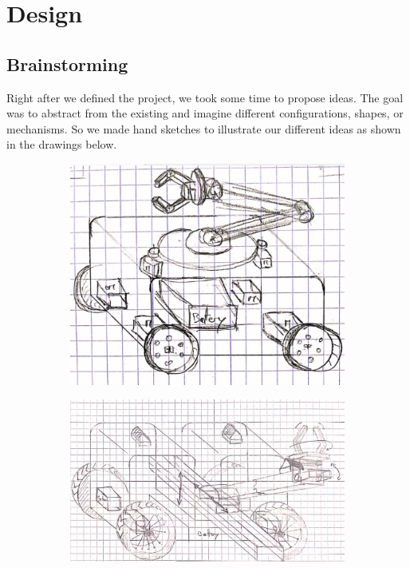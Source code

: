 \section{Design}\insertloftspace
\setcounter{figure}{0}\setcounter{table}{0}
\label{Des}
\subsection{Brainstorming}
\label{BraSto}
Right after we defined the project, we took some time to propose ideas. The goal was to abstract from the existing and imagine different configurations, shapes, or mechanisms. So we made hand sketches to illustrate our different ideas as shown in the drawings below. 
\begin{figure}[H]
    \begin{subfigure}{.5\linewidth}
        \centering
        \includegraphics[scale = 0.3]{Images/Section03/Drawing1.png}
        \caption{}
        \label{fig:Drawing1}
    \end{subfigure}%
    \begin{subfigure}{.5\linewidth}
        \centering
        \includegraphics[scale = 0.3]{Images/Section03/Drawing2.png}

\end{subfigure}
\end{figure}

